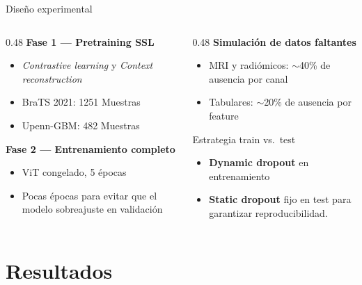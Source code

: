 \documentclass[aspectratio=169]{beamer}
\begin{document}
\begin{frame}{Diseño experimental}
  \begin{columns}[T]
    \begin{column}{0.48\textwidth}
      \textbf{Fase 1 — Pretraining SSL}
      \begin{itemize}
        \item \textit{Contrastive learning} y \textit{Context reconstruction}
        \item BraTS 2021: 1251 Muestras
        \item Upenn-GBM: 482 Muestras
      \end{itemize}

      \medskip
      \textbf{Fase 2 — Entrenamiento completo}
      \begin{itemize}
        \item ViT congelado, 5 épocas
        \item Pocas épocas para evitar que el modelo sobreajuste en validación
      \end{itemize}
    \end{column}
    \begin{column}{0.48\textwidth}
      \textbf{Simulación de datos faltantes}
      \begin{itemize}
        \item MRI y radiómicos: $\sim$40\% de ausencia por canal
        \item Tabulares: $\sim$20\% de ausencia por feature
      \end{itemize}

      \medskip
      \begin{block}{Estrategia train vs.\ test}
        \small
        \begin{itemize}
        \item  \textbf{Dynamic dropout} en entrenamiento \\ 
        \item \textbf{Static dropout} fijo en test para garantizar reproducibilidad.
        \end{itemize}
      \end{block}
    \end{column}
  \end{columns}
\end{frame}

\section{Resultados}
\end{document}
